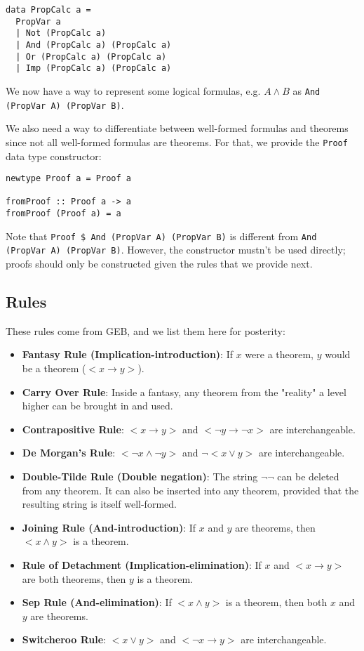 \documentclass{article}
\begin{document}
\begin{lstlisting}
data PropCalc a =
  PropVar a
  | Not (PropCalc a)
  | And (PropCalc a) (PropCalc a)
  | Or (PropCalc a) (PropCalc a)
  | Imp (PropCalc a) (PropCalc a)
\end{lstlisting}

We now have a way to represent some logical formulas, e.g. $A \land B$ as \texttt{And (PropVar A) (PropVar B)}.

We also need a way to differentiate between well-formed formulas and theorems since not all well-formed formulas are theorems. For that, we provide the \texttt{Proof} data type constructor:

\begin{lstlisting}
newtype Proof a = Proof a

fromProof :: Proof a -> a
fromProof (Proof a) = a
\end{lstlisting}

Note that \texttt{Proof \$ And (PropVar A) (PropVar B)} is different from \texttt{And (PropVar A) (PropVar B)}. However, the constructor mustn't be used directly; proofs should only be constructed given the rules that we provide next.

\subsection{Rules}

These rules come from GEB, and we list them here for posterity:

\begin{itemize}
\item \textbf{Fantasy Rule (Implication-introduction)}: If $x$ were a theorem, $y$ would be a theorem ($<x \to y>$).
\item \textbf{Carry Over Rule}: Inside a fantasy, any theorem from the "reality" a level higher can be brought in and used.
\item \textbf{Contrapositive Rule}: $< x \to y>$ and $< \neg y \to \neg x>$ are interchangeable.
\item \textbf{De Morgan's Rule}: $< \neg x \land \neg y>$ and $\neg<x \lor y>$ are interchangeable.
\item \textbf{Double-Tilde Rule (Double negation)}: The string $\neg\neg$ can be deleted from any theorem. It can also be inserted into any theorem, provided that the resulting string is itself well-formed.
\item \textbf{Joining Rule (And-introduction)}: If $x$ and $y$ are theorems, then $<x \land y>$ is a theorem.
\item \textbf{Rule of Detachment (Implication-elimination)}: If $x$ and $<x \to y>$ are both theorems, then $y$ is a theorem.
\item \textbf{Sep Rule (And-elimination)}: If $<x \land y>$ is a theorem, then both $x$ and $y$ are theorems.
\item \textbf{Switcheroo Rule}: $<x \lor y>$ and $<\neg x \to y>$ are interchangeable.
\end{itemize}
\end{document}
